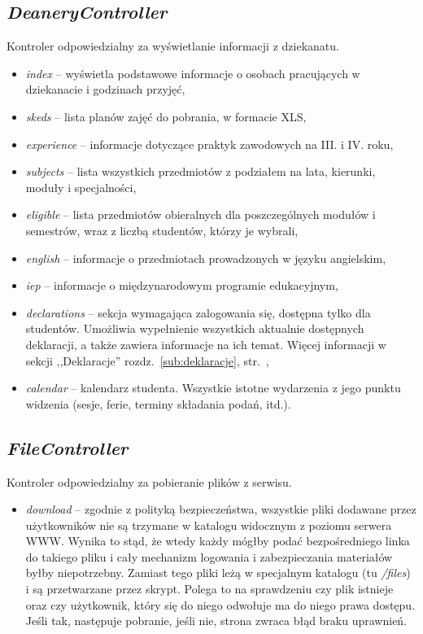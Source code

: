 \documentclass[a4paper,12pt,oneside]{report}
\begin{document}
\subsection{\emph{DeaneryController}}
\label{con:deanery}
  Kontroler odpowiedzialny za wyświetlanie informacji z dziekanatu.
\begin{itemize}
  \item \emph{index} -- wyświetla podstawowe informacje o osobach pracujących w dziekanacie i godzinach przyjęć,
  \item \emph{skeds} -- lista planów zajęć do pobrania, w formacie XLS,
  \item \emph{experience} -- informacje dotyczące praktyk zawodowych na III. i IV. roku,
  \item \emph{subjects} -- lista wszystkich przedmiotów z podziałem na lata, kierunki, moduły i specjalności,
  \item \emph{eligible} -- lista przedmiotów obieralnych dla poszczególnych modułów i semestrów, wraz z liczbą studentów, którzy je wybrali,
  \item \emph{english} -- informacje o przedmiotach prowadzonych w języku angielskim,
  \item \emph{iep} -- informacje o międzynarodowym programie edukacyjnym,
  \item \emph{declarations} -- sekcja wymagająca zalogowania się, dostępna tylko dla studentów. Umożliwia wypełnienie wszystkich aktualnie dostępnych deklaracji, a także zawiera informacje na ich temat. Więcej informacji w sekcji ,,Deklaracje'' rozdz.~\ref{sub:deklaracje}, str.~\pageref{sub:deklaracje},
  \item \emph{calendar} -- kalendarz studenta. Wszystkie istotne wydarzenia z jego punktu widzenia (sesje, ferie, terminy składania podań, itd.).
\end{itemize}

\subsection{\emph{FileController}}
\label{con:file}
  Kontroler odpowiedzialny za pobieranie plików z serwisu.
\begin{itemize}
  \item \emph{download} -- zgodnie z polityką bezpieczeństwa, wszystkie pliki dodawane przez użytkowników nie są trzymane w katalogu widocznym z poziomu serwera WWW. Wynika to stąd, że wtedy każdy mógłby podać bezpośredniego linka do takiego pliku i cały mechanizm logowania i zabezpieczania materiałów byłby niepotrzebny. Zamiast tego pliki leżą w specjalnym katalogu (tu \emph{/files}) i są przetwarzane przez skrypt. Polega to na sprawdzeniu czy plik istnieje oraz czy użytkownik, który się do niego odwołuje ma do niego prawa dostępu. Jeśli tak, następuje pobranie, jeśli nie, strona zwraca błąd braku uprawnień.
\end{itemize}
\end{document}

